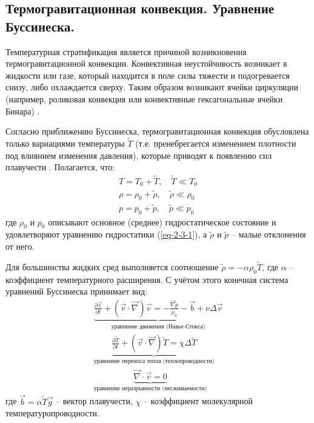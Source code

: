 \subsection{Термогравитационная конвекция. Уравнение Буссинеска.}
Температурная стратификация является причиной возникновения термогравитационной конвекции.
Конвективная неустойчивость возникает в жидкости или газе, который находится в поле силы тяжести и подогревается снизу, либо охлаждается сверху.
Таким образом возникают ячейки циркуляции (например, роликовая конвекция или конвективные гексагональные ячейки Бинара) \cite{Nosov2019-5}.

Согласно приближению Буссинеска, термогравитационная конвекция обусловлена только вариациями температуры $\widetilde{T}$ (т.е. пренебрегается изменением плотности под влиянием изменения давления), которые приводят к появлению сил плавучести \cite{Носов-2013}.
Полагается, что:
\begin{equation}\label{eq-3-3-1}
\begin{gathered}
T=T_0+\widetilde{T},\quad\widetilde{T}\ll T_0
\\
\rho=\rho_0+\widetilde{\rho},\quad\widetilde{\rho}\ll\rho_0
\\
p=p_0+\widetilde{p},\quad\widetilde{p}\ll p_0
\end{gathered}
\end{equation}
где  $\rho_0$ и $p_0$ описывают основное (среднее) гидростатическое состояние и удовлетворяют уравнению гидростатики (\ref{eq-2-3-1}), а $\widetilde{\rho}$ и $\widetilde{p}$ -- малые отклонения от него.

Для большинства жидких сред выполняется соотношение $\widetilde{\rho}=-\alpha\rho_0\widetilde{T}$, где $\alpha$ -- коэффициент температурного расширения.
С учётом этого конечная система уравнений Буссинеска принимает вид:
\begin{equation}
\begin{gathered}
\underbrace{\frac{\partial \vec{v}}{\partial t}+\left(\vec{v}\cdot\vec{\nabla}\right)\vec{v}=-\frac{\vec{\nabla}\widetilde{p}}{\rho_0}-\vec{b}+\nu\Delta\vec{v}}_\text{уравнение движения (Навье-Стокса)}
\\
\underbrace{\frac{\partial \widetilde{T}}{\partial t}+\left(\vec{v}\cdot\vec{\nabla}\right)\widetilde{T}=\chi\Delta\widetilde{T}}_\text{уравнение переноса тепла (теплопроводности)}
\\
\underbrace{\vec{\nabla}\cdot\vec{v}=0}_\text{уравнение неразрывности (несжимаемости)}
\end{gathered}
\end{equation}
где $\vec{b}=\alpha\widetilde{T}\vec{g}$ -- вектор плавучести, $\chi$ -- коэффициент молекулярной температуропроводности.
